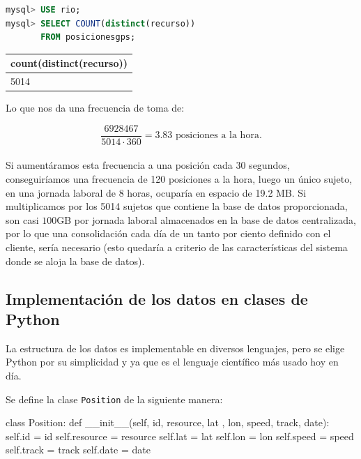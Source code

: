 \documentclass[a4paper, 12pt]{article}
\begin{document}
\begin{lstlisting}[language=sql, columns=fullflexible, basicstyle=\small, frame=tbrl, showstringspaces=false]
mysql> USE rio;
mysql> SELECT COUNT(distinct(recurso)) 
	   FROM posicionesgps;
\end{lstlisting}

\begin{center}
 \begin{tabular}{|l|}
 \hline
	count(distinct(recurso)) \\
 \hline
	5014 \\
 \hline
 
 \end{tabular}
\end{center}

Lo que nos da una frecuencia de toma de:

$$ \frac{6928467}{5014 \cdot 360} = 3.83 \text{ posiciones a la hora.}$$ \\

Si aument\'aramos esta frecuencia a una posici\'on cada 30 segundos, conseguir\'iamos una frecuencia de 120 posiciones a la hora, luego un \'unico sujeto, en una jornada laboral de 8 horas, ocupar\'ia en espacio de 19.2 MB. Si multiplicamos por los 5014 sujetos que contiene la base de datos proporcionada, son casi $100$GB por jornada laboral almacenados en la base de datos centralizada, por lo que una consolidaci\'on cada d\'ia de un tanto por ciento definido con el cliente, ser\'ia necesario (esto quedar\'ia a criterio de las caracter\'isticas del sistema donde se aloja la base de datos).

\subsection{Implementaci\'on de los datos en clases de Python}\label{sec:positionClass}

La estructura de los datos es implementable en diversos lenguajes, pero se elige Python por su simplicidad y ya que es el lenguaje cient\'ifico m\'as usado hoy en d\'ia.

Se define la clase \texttt{Position} de la siguiente manera:

\begin{python}
class Position:
    def __init__(self, id, resource, lat
    		    , lon, speed, track, date):
        self.id = id
        self.resource = resource
        self.lat = lat
        self.lon = lon
        self.speed = speed
        self.track = track
        self.date = date
\end{python}
\end{document}
